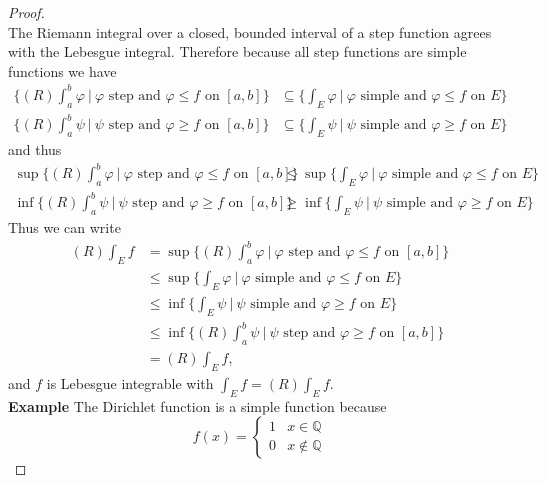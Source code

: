 \begin{flushleft}
\begin{proof}
\[        \]
        The Riemann integral over a closed, bounded interval of a step function agrees with the Lebesgue integral.
        Therefore because all step functions are simple functions we have 
        \begin{align*}
            \biggl\{(R)\int_a^b\varphi\ |\ \varphi\text{ step and }\varphi\le f\text{ on }[a,b]\biggr\}
            &\subseteq \biggl\{\int_E\varphi\ |\ \varphi\text{ simple and }\varphi\le f\text{ on }E\biggr\}\\
            \biggl\{(R)\int_a^b\psi\ |\ \psi\text{ step and }\varphi\ge f\text{ on }[a,b]\biggr\}
            &\subseteq\biggl\{\int_E\psi\ |\ \psi\text{ simple and }\varphi\ge f\text{ on }E\biggr\}
        \end{align*}
        and thus
        \begin{align*}
            \sup\biggl\{(R)\int_a^b\varphi\ |\ \varphi\text{ step and }\varphi\le f\text{ on }[a,b]\biggr\}
            &\le \sup\biggl\{\int_E\varphi\ |\ \varphi\text{ simple and }\varphi\le f\text{ on }E\biggr\}\\
            \inf\biggl\{(R)\int_a^b\psi\ |\ \psi\text{ step and }\varphi\ge f\text{ on }[a,b]\biggr\}
            &\ge\inf\biggl\{\int_E\psi\ |\ \psi\text{ simple and }\varphi\ge f\text{ on }E\biggr\}
        \end{align*}
        Thus we can write
        \begin{align*}
            (R)\int_Ef&= \sup\biggl\{(R)\int_a^b\varphi\ |\ \varphi\text{ step and }\varphi\le f\text{ on }[a,b]\biggr\}\\
            &\le\sup\biggl\{\int_E\varphi\ |\ \varphi\text{ simple and }\varphi\le f\text{ on }E\biggr\}\\
            &\le\inf\biggl\{\int_E\psi\ |\ \psi\text{ simple and }\varphi\ge f\text{ on }E\biggr\}\\
            &\le\inf\biggl\{(R)\int_a^b\psi\ |\ \psi\text{ step and }\varphi\ge f\text{ on }[a,b]\biggr\}\\
            &=(R)\int_Ef,
        \end{align*}
        and $f$ is Lebesgue integrable with $\int_Ef=(R)\int_Ef$.
        \\\bigskip
        \textbf{Example} The Dirichlet function is a simple function because 
        \[
        f(x)=
        \begin{cases}
            1&x\in\mathbb{Q}\\
            0&x\notin\mathbb{Q}
        \end{cases}    
\]
\end{proof}
\end{flushleft}
